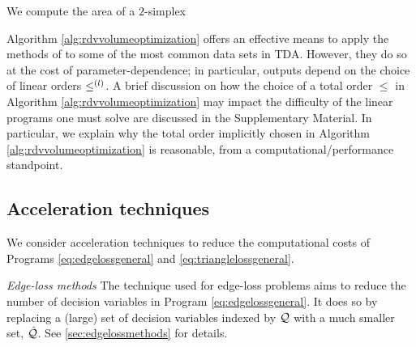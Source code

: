  We compute the area of a $2$-simplex \DIFdelbegin {}\DIFdelend \DIFaddbegin {}
\DIFaddend 



\begin{remark} Algorithm \ref{alg:rdvvolumeoptimization} offers an effective means to apply the methods of \cite{Obayashi2018} to some of the most common data sets in TDA.  However, they do so at the cost of parameter-dependence; in particular, outputs depend on the choice of linear orders $\le^{(l)}$.  
 A brief discussion on how the choice of a total order $\le$ in Algorithm \ref{alg:rdvvolumeoptimization} may impact the difficulty of the linear programs one must solve are discussed in the Supplementary Material.  In particular, we explain why the total order implicitly chosen in Algorithm \ref{alg:rdvvolumeoptimization} is reasonable,  from a computational/performance standpoint.
\end{remark}


 
\subsection{Acceleration techniques} \label{acceleratation technique}

We consider acceleration techniques to reduce the computational costs of Programs \eqref{eq:edgelossgeneral} and \eqref{eq:trianglelossgeneral}.

\emph{Edge-loss methods} The technique used for edge-loss problems aims to reduce the number of decision variables in Program \eqref{eq:edgelossgeneral}.  It does so by replacing a (large) set of decision variables indexed by $\mathcal Q$ with a much smaller set, $\hat {\mathcal Q}$.  See \se \ref{sec:edgelossmethods} for details.

